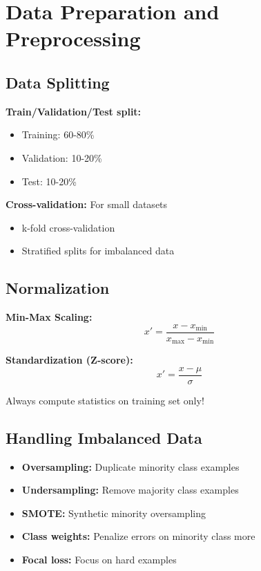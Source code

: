 
\section{Data Preparation and Preprocessing}
\label{sec:data-preparation}

\subsection{Data Splitting}

\textbf{Train/Validation/Test split:}
\begin{itemize}
    \item Training: 60-80\%
    \item Validation: 10-20\%
    \item Test: 10-20\%
\end{itemize}

\textbf{Cross-validation:} For small datasets
\begin{itemize}
    \item k-fold cross-validation
    \item Stratified splits for imbalanced data
\end{itemize}

\subsection{Normalization}

\textbf{Min-Max Scaling:}
\begin{equation}
x' = \frac{x - x_{\min}}{x_{\max} - x_{\min}}
\end{equation}

\textbf{Standardization (Z-score):}
\begin{equation}
x' = \frac{x - \mu}{\sigma}
\end{equation}

Always compute statistics on training set only! 

\subsection{Handling Imbalanced Data}

\begin{itemize}
    \item \textbf{Oversampling:} Duplicate minority class examples
    \item \textbf{Undersampling:} Remove majority class examples
    \item \textbf{SMOTE:} Synthetic minority oversampling
    \item \textbf{Class weights:} Penalize errors on minority class more
    \item \textbf{Focal loss:} Focus on hard examples
\end{itemize}

